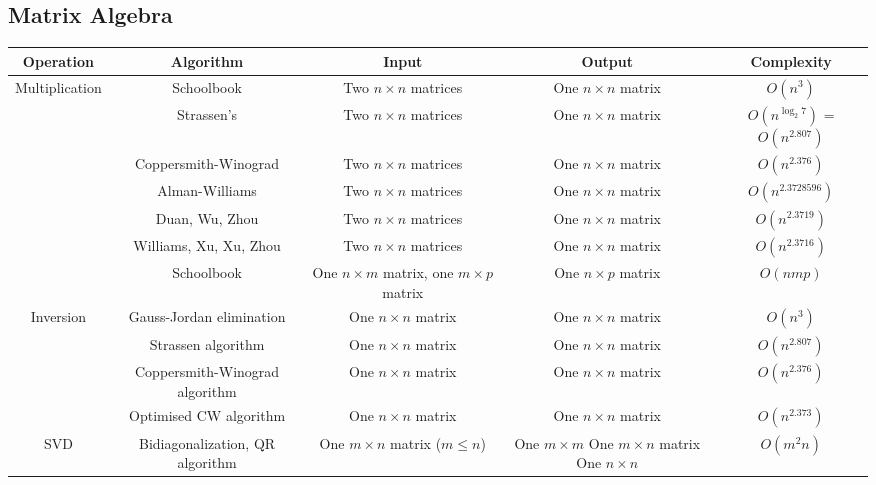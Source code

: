 \documentclass{article}
\begin{document}

\newpage
\subsection*{Matrix Algebra}

\begin{table}[ht]
	\centering
	\scriptsize
	\begin{tabular}{c cccc}
		\textbf{Operation} & \textbf{Algorithm} & \textbf{Input} & \textbf{Output} & \textbf{Complexity} \\
		\hline
		Multiplication & Schoolbook & Two $n \times n$ matrices & One $n\times n$ matrix & $O(n^3)$ \\
		 &Strassen's & Two $n \times n$  matrices & One $n\times n$ matrix &$O(n^{\log_2{7}})$ = $O(n^{2.807})$\\
		 &Coppersmith-Winograd & Two $n \times n$  matrices & One $n\times n$ matrix &$O(n^{2.376})$\\
	     &Alman-Williams & Two $n \times n$  matrices & One $n\times n$ matrix& $O(n^{2.3728596})$ \\
	     &Duan, Wu, Zhou & Two $n \times n$  matrices & One $n\times n$ matrix& $O(n^{2.3719})$ \\
	     &Williams, Xu, Xu, Zhou & Two $n \times n$  matrices & One $n\times n$ matrix& $O(n^{2.3716})$ \\
		 &Schoolbook & One $n\times m$ matrix, one $m\times p$ matrix & One $n\times p$ matrix& $O(nmp)$  \\
		\hline
		Inversion &Gauss-Jordan elimination & One $n\times n$ matrix & One $n\times n$ matrix& $O(n^3)$  \\
		 &Strassen algorithm & One $n\times n$ matrix & One $n\times n$ matrix& $O(n^{2.807})$  \\
		 &Coppersmith-Winograd algorithm & One $n\times n$ matrix & One $n\times n$ matrix& $O(n^{2.376})$ \\
		 &Optimised CW algorithm & One $n\times n$ matrix & One $n\times n$ matrix& $O(n^{2.373})$  \\
		 \hline
		SVD &Bidiagonalization, QR algorithm & One $m\times n$ matrix ($m\leq n$)& \makecell {One $m\times m$ \\ One $m \times n$ matrix \\ One $n \times n$} & $O(m^2n)$  \\

\end{tabular}
\end{table}
\end{document}

